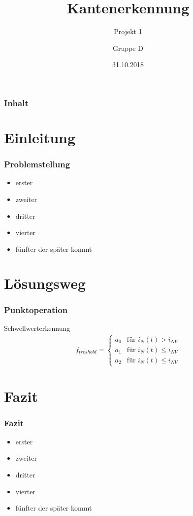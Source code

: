 \documentclass[12pt]{beamer}
\begin{document}
	\author{Gruppe D}
	\title{Kantenerkennung}
	\subtitle{Projekt 1}
	\date{31.10.2018}
	\subject{was das}
	
	
\begin{frame}
	\titlepage
\end{frame}

\begin{frame}
	\frametitle{Inhalt}
	\tableofcontents	
\end{frame}

\section{Einleitung}
	\begin{frame}
		\frametitle{Problemstellung}
		\begin{itemize}
			\item erster
			\item zweiter
			\item dritter
			\item vierter
			\item fünfter der später kommt		
		\end{itemize}
		
	\end{frame}

\section{Lösungsweg}
\begin{frame}
	\frametitle{Punktoperation}
	\begin{block}{Schwellwerterkennung}	
		\begin{eqnarray*}
			f_{treshold}=
			\begin{cases}
			a_0   			& \text{für }i_N(t) > i_{NV}\\
			a_1        		& \text{für }i_N(t) \leq i_{NV} \\
			a_2        		& \text{für }i_N(t) \leq i_{NV}
			\end{cases}
		\end{eqnarray*}
	\end{block}
\end{frame}

 \section{Fazit}
	\begin{frame}
		\frametitle{Fazit}
		\begin{itemize}
			\item erster
			\item zweiter
			\item dritter
			\item vierter
			\item fünfter der später kommt		
		\end{itemize}
	\end{frame}
\end{document}
